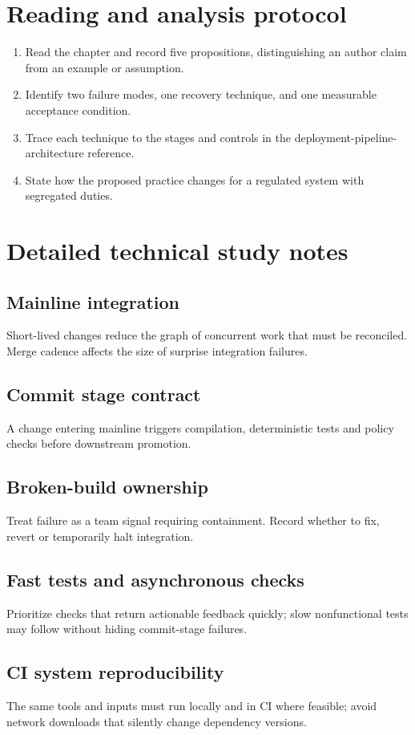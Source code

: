 \documentclass[10pt,letterpaper]{article}
\begin{document}
\section{Reading and analysis protocol}
\begin{enumerate}
\item Read the chapter and record five propositions, distinguishing an author claim from an example or assumption.
\item Identify two failure modes, one recovery technique, and one measurable acceptance condition.
\item Trace each technique to the stages and controls in the deployment-pipeline-architecture reference.
\item State how the proposed practice changes for a regulated system with segregated duties.
\end{enumerate}

\section{Detailed technical study notes}
\subsection{Mainline integration}
Short-lived changes reduce the graph of concurrent work that must be reconciled. Merge cadence affects the size of surprise integration failures.

\subsection{Commit stage contract}
A change entering mainline triggers compilation, deterministic tests and policy checks before downstream promotion.

\subsection{Broken-build ownership}
Treat failure as a team signal requiring containment. Record whether to fix, revert or temporarily halt integration.

\subsection{Fast tests and asynchronous checks}
Prioritize checks that return actionable feedback quickly; slow nonfunctional tests may follow without hiding commit-stage failures.

\subsection{CI system reproducibility}
The same tools and inputs must run locally and in CI where feasible; avoid network downloads that silently change dependency versions.
\end{document}
